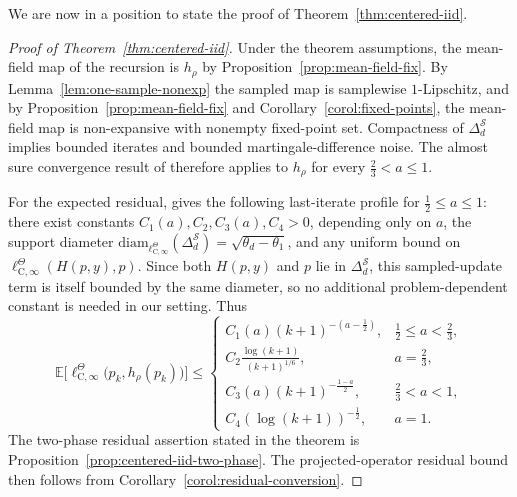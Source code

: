 \documentclass{article}
\newcommand{\X}{\mathcal{S}}
\newcommand{\E}{\mathbb{E}}
\begin{document}
We are now in a position to state the proof of Theorem~\ref{thm:centered-iid}.
\begin{proof}[Proof of Theorem~\ref{thm:centered-iid}]
Under the theorem assumptions, the mean-field map of the recursion is $h_\rho$ by Proposition~\ref{prop:mean-field-fix}. By Lemma~\ref{lem:one-sample-nonexp} the sampled map is samplewise $1$-Lipschitz, and by Proposition~\ref{prop:mean-field-fix} and Corollary~\ref{corol:fixed-points}, the mean-field map is non-expansive with nonempty fixed-point set. Compactness of $\Delta^\X_d$ implies bounded iterates and bounded martingale-difference noise. The almost sure convergence result of \citet[Theorem~2.5 and Example~2.7]{bravo2024stochastic} therefore applies to $h_\rho$ for every $\frac{2}{3}< a \le 1$.

For the expected residual, \citet[Theorem~4.4]{bravo2024stochastic} gives the following last-iterate profile for $\frac{1}{2}\le a \le 1$: there exist constants $C_1(a), C_2, C_3(a), C_4 >0$, depending only on $a$, the support diameter $\mathrm{diam}_{\ell^\Theta_{\mathrm C, \infty}}(\Delta^\X_d) = \sqrt{\theta_d - \theta_1}$, and any uniform bound on $\ell^\Theta_{\mathrm C, \infty}(H(p, y), p)$. Since both $H(p, y)$ and $p$ lie in $\Delta^\X_d$, this sampled-update term is itself bounded by the same diameter, so no additional problem-dependent constant is needed in our setting. Thus
\begin{equation}
\E\bigl[\ell^\Theta_{\mathrm C, \infty}\bigl(p_k, h_\rho(p_k)\bigr)\bigr] \le \begin{cases}
C_1(a)(k+1)^{-(a-\frac{1}{2})}, &\frac{1}{2}\le a < \frac{2}{3},\\
C_2\frac{\log(k+1)}{(k+1)^{1/6}}, &a=\frac{2}{3},\\
C_3(a)(k+1)^{-\frac{1-a}{2}}, &\frac{2}{3}<a<1,\\
C_4(\log(k+1))^{-\frac{1}{2}}, &a=1.
\end{cases}
\end{equation}
The two-phase residual assertion stated in the theorem is Proposition~\ref{prop:centered-iid-two-phase}. The projected-operator residual bound then follows from Corollary~\ref{corol:residual-conversion}.
\end{proof}
\end{document}
